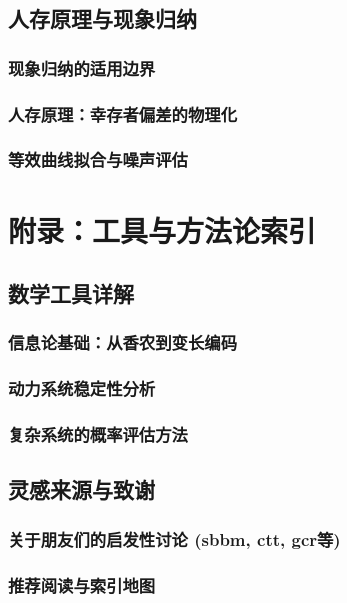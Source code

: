 \documentclass[openany]{book} %
\begin{document}
	\chapter{人存原理与现象归纳}
	\section{现象归纳的适用边界}
	\section{人存原理：幸存者偏差的物理化}
	\section{等效曲线拟合与噪声评估}

	\appendix
	\part{附录：工具与方法论索引}

	\chapter{数学工具详解}
	\section{信息论基础：从香农到变长编码}
	\section{动力系统稳定性分析}
	\section{复杂系统的概率评估方法}

	\chapter{灵感来源与致谢}
	\section{关于朋友们的启发性讨论 (sbbm, ctt, gcr等)}
	\section{推荐阅读与索引地图}

	\backmatter
	
\end{document}
